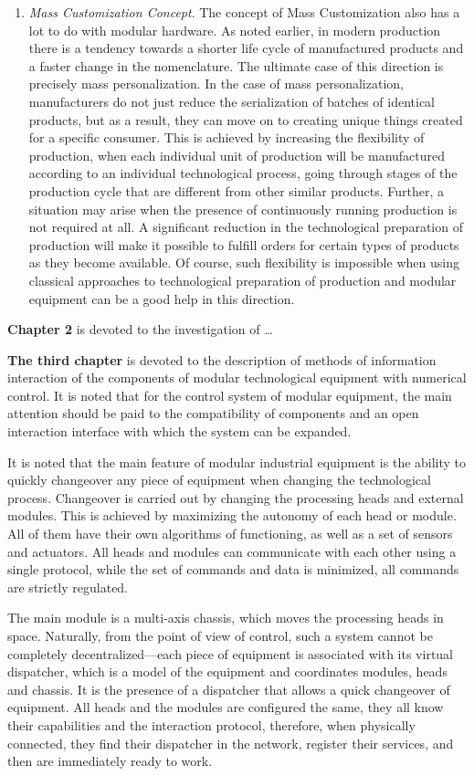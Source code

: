 \begin{enumerate}
	\item\textit{Mass Customization Concept}. The concept of Mass Customization also has a lot to do with modular hardware. As noted earlier, in modern production there is a tendency towards a shorter life cycle of manufactured products and a faster change in the nomenclature. The ultimate case of this direction is precisely mass personalization. In the case of mass personalization, manufacturers do not just reduce the serialization of batches of identical products, but as a result, they can move on to creating unique things created for a specific consumer. This is achieved by increasing the flexibility of production, when each individual unit of production will be manufactured according to an individual technological process, going through stages of the production cycle that are different from other similar products. Further, a situation may arise when the presence of continuously running production is not required at all. A significant reduction in the technological preparation of production will make it possible to fulfill orders for certain types of products as they become available. Of course, such flexibility is impossible when using classical approaches to technological preparation of production and modular equipment can be a good help in this direction.
\end{enumerate}

\textbf{Chapter 2} is devoted to the investigation of \dots

\textbf{The third chapter} is devoted to the description of methods of information interaction of the components of modular technological equipment with numerical control. It is noted that for the control system of modular equipment, the main attention should be paid to the compatibility of components and an open interaction interface with which the system can be expanded.

It is noted that the main feature of modular industrial equipment is the ability to quickly changeover any piece of equipment when changing the technological process. Changeover is carried out by changing the processing heads and external modules. This is achieved by maximizing the autonomy of each head or module. All of them have their own algorithms of functioning, as well as a set of sensors and actuators. All heads and modules can communicate with each other using a single protocol, while the set of commands and data is minimized, all commands are strictly regulated.

The main module is a multi-axis chassis, which moves the processing heads in space. Naturally, from the point of view of control, such a system cannot be completely decentralized---each piece of equipment is associated with its virtual dispatcher, which is a model of the equipment and coordinates modules, heads and chassis. It is the presence of a dispatcher that allows a quick changeover of equipment. All heads and the modules are configured the same, they all know their capabilities and the interaction protocol, therefore, when physically connected, they find their dispatcher in the network, register their services, and then are immediately ready to work.

